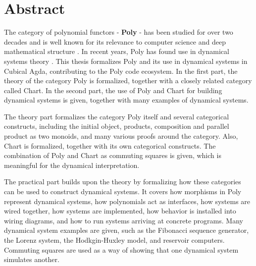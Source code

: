 
\thispagestyle{plain}			%
\section*{Abstract}

The category of polynomial functors - \textbf{Poly} - has been studied for over two decades and is well known for its relevance to computer science \cite{containersPaper} and deep mathematical structure \cite{polynomialFunctorsCategory}.
In recent years, Poly has found use in dynamical systems theory \cite{poly-book} \cite{css}. 
This thesis formalizes Poly and its use in dynamical systems in Cubical Agda, contributing to the Poly code ecosystem.
In the first part, the theory of the category Poly is formalized, together with a closely related category called Chart. 
In the second part, the use of Poly and Chart for building dynamical systems is given, together with many examples of dynamical systems.

The theory part formalizes the category Poly itself and several categorical constructs, including the initial object, products, composition and parallel product as two monoids, and many various proofs around the category.
Also, Chart is formalized, together with its own categorical constructs.
The combination of Poly and Chart as commuting squares is given, which is meaningful for the dynamical interpretation.

The practical part builds upon the theory by formalizing how these categories can be used to construct dynamical systems.
It covers how morphisms in Poly represent dynamical systems, how polynomials act as interfaces, how
systems are wired together, how systems are implemented, how behavior is installed into wiring diagrams, and how to run systems arriving at concrete programs.
Many dynamical system examples are given, such as the Fibonacci sequence generator, the Lorenz system, the Hodkgin-Huxley model, and reservoir computers.
Commuting squares are used as a way of showing that one dynamical system simulates another.



